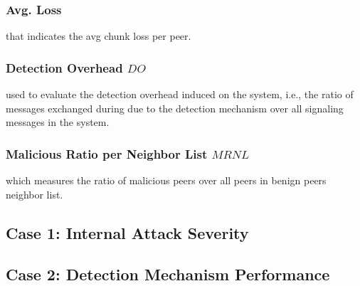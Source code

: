 \subsubsection*{Avg. Loss} that indicates the avg chunk loss per peer.
\subsubsection*{Detection Overhead $DO$} used to evaluate the detection overhead induced on the system, i.e., the ratio of messages exchanged during due to the detection mechanism over all signaling messages in the system.
\subsubsection*{Malicious Ratio per Neighbor List $MRNL$} which measures the ratio of malicious peers over all peers in benign peers neighbor list.

\subsection{Case 1: Internal Attack Severity}



\subsection{Case 2: Detection Mechanism Performance}

